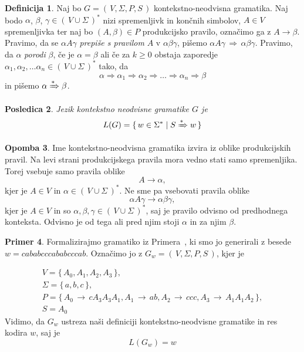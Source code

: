 \documentclass{amsart}
\theoremstyle{definition} %
\newtheorem{definicija}{Definicija}[section]
\newtheorem{primer}[definicija]{Primer}
\newtheorem{opomba}[definicija]{Opomba}
\theoremstyle{plain} %
\newtheorem{posledica}[definicija]{Posledica}
\begin{document}
\begin{definicija}
    
    Naj bo $ G = (\, V, \Sigma, P, S \,) $ kontekstno-neodvisna gramatika. Naj bodo $ \alpha $,
    $ \beta $, $ \gamma \in (\, V \cup \Sigma \,)^* $ nizi spremenljivk in končnih simbolov,
    $ A \in V $ spremenljivka ter naj bo $ ( A, \beta ) \in P $ produkcijsko pravilo,
    označimo ga z $ A \rightarrow \beta $. Pravimo, da se $ \alpha A \gamma $ 
    \textit{prepiše s pravilom} $ A $ v $ \alpha\beta\gamma $, pišemo $ \alpha A \gamma \, \Rightarrow \,
    \alpha\beta\gamma $. Pravimo, da $ \alpha $ \textit{porodi} $ \beta $, če je $ \alpha = \beta $ ali če
    za $ k \geq 0 $ obstaja zaporedje $ \alpha_1, \alpha_2, \ldots \alpha_n
    \in (\, V \cup \Sigma \,)^* $ tako, da 
    \[
        \alpha \Rightarrow \alpha_1 \Rightarrow \alpha_2 \Rightarrow \ldots \Rightarrow \alpha_n
        \Rightarrow \beta
    \]
    in pišemo $ \alpha \xRightarrow{*} \beta $.

\end{definicija}

\begin{posledica}

    Jezik kontekstno neodvisne gramatike $ G $ je
    \[
        L(G) = \{\, w \in \Sigma^* \mid S \xRightarrow{*} w \,\}
    \]

\end{posledica}

\begin{opomba}
    
    Ime kontekstno-neodvisna gramatika izvira iz oblike produkcijskih pravil. Na levi
    strani produkcijskega pravila mora vedno stati samo spremenljika. Torej vsebuje samo
    pravila oblike
    \[
        A \rightarrow \alpha,
    \]
    kjer je  $ A \in V $ in $ \alpha \in (\, V \cup \Sigma \,)^* $. Ne sme pa vsebovati
    pravila oblike
    \[
        \alpha A \gamma \rightarrow \alpha\beta\gamma,
    \]
    kjer je $ A \in V $ in so $ \alpha, \beta, \gamma \in (\, V \cup \Sigma \,)^* $, saj je
    pravilo odvisno od predhodnega konteksta. Odvisno je od tega ali pred njim stoji $ \alpha $
    in za njim $ \beta $.

\end{opomba}

\begin{primer}
    
    Formalizirajmo gramatiko iz Primera~, ki smo jo generirali z besede
    $ w = cababcccababcccab $. Označimo jo z $ G_w = (\, V, \Sigma, P, S \,) $, kjer je 

    \begin{gather*}
         V = \{\, A_0, A_1, A_2, A_3 \,\}, \\
         \Sigma = \{\, a, b, c \,\}, \\
         P = \{\, A_0 \, \rightarrow \, cA_3A_3A_1, A_1 \, \rightarrow \, ab, A_2 \, 
        \rightarrow \, ccc, A_3 \, \rightarrow \, A_1A_1A_2 \,\}, \\
         S = A_0
    \end{gather*}
    Vidimo, da $ G_w $ ustreza naši definiciji kontekstno-neodvisne gramatike
    in res kodira $ w $, saj je 
    \[
        L(G_w) = w
    \]

\end{primer}
\end{document}

